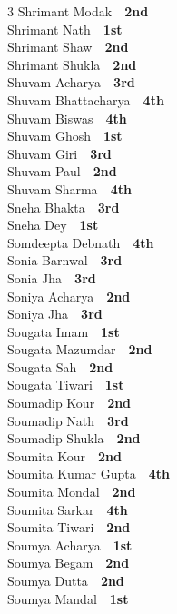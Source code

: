 \documentclass[11pt,a4paper]{article}
\begin{document}
\begin{multicols}{3}
Shrimant Modak~\dotfill~\textbf{2nd}\\
Shrimant Nath~\dotfill~\textbf{1st}\\
Shrimant Shaw~\dotfill~\textbf{2nd}\\
Shrimant Shukla~\dotfill~\textbf{2nd}\\
Shuvam Acharya~\dotfill~\textbf{3rd}\\
Shuvam Bhattacharya~\dotfill~\textbf{4th}\\
Shuvam Biswas~\dotfill~\textbf{4th}\\
Shuvam Ghosh~\dotfill~\textbf{1st}\\
Shuvam Giri~\dotfill~\textbf{3rd}\\
Shuvam Paul~\dotfill~\textbf{2nd}\\
Shuvam Sharma~\dotfill~\textbf{4th}\\
Sneha Bhakta~\dotfill~\textbf{3rd}\\
Sneha Dey~\dotfill~\textbf{1st}\\
Somdeepta Debnath~\dotfill~\textbf{4th}\\
Sonia Barnwal~\dotfill~\textbf{3rd}\\
Sonia Jha~\dotfill~\textbf{3rd}\\
Soniya Acharya~\dotfill~\textbf{2nd}\\
Soniya Jha~\dotfill~\textbf{3rd}\\
Sougata Imam~\dotfill~\textbf{1st}\\
Sougata Mazumdar~\dotfill~\textbf{2nd}\\
Sougata Sah~\dotfill~\textbf{2nd}\\
Sougata Tiwari~\dotfill~\textbf{1st}\\
Soumadip Kour~\dotfill~\textbf{2nd}\\
Soumadip Nath~\dotfill~\textbf{3rd}\\
Soumadip Shukla~\dotfill~\textbf{2nd}\\
Soumita Kour~\dotfill~\textbf{2nd}\\
Soumita Kumar Gupta~\dotfill~\textbf{4th}\\
Soumita Mondal~\dotfill~\textbf{2nd}\\
Soumita Sarkar~\dotfill~\textbf{4th}\\
Soumita Tiwari~\dotfill~\textbf{2nd}\\
Soumya Acharya~\dotfill~\textbf{1st}\\
Soumya Begam~\dotfill~\textbf{2nd}\\
Soumya Dutta~\dotfill~\textbf{2nd}\\
Soumya Mandal~\dotfill~\textbf{1st}\\

\end{multicols}
\end{document}
